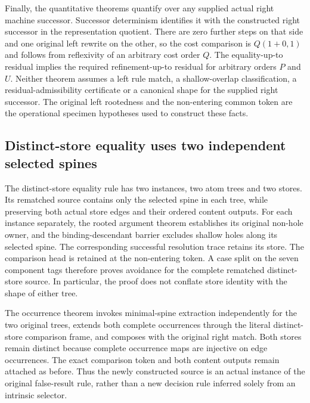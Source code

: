 Finally, the quantitative theorems quantify over any supplied actual right
machine successor. Successor determinism identifies it with the constructed
right successor in the representation quotient. There are zero further steps
on that side and one original left rewrite on the other, so the cost comparison
is $Q(1+0,1)$ and follows from reflexivity of an arbitrary cost order $Q$.
The equality-up-to residual implies the required refinement-up-to residual
for arbitrary orders $P$ and $U$. Neither theorem assumes a left rule match,
a shallow-overlap classification, a residual-admissibility certificate or a
canonical shape for the supplied right successor. The original left rootedness
and the non-entering common token are the operational specimen hypotheses
used to construct these facts.

\subsection{Distinct-store equality uses two independent selected spines}
The distinct-store equality rule has two instances, two atom trees and two
stores. Its rematched source contains only the selected spine in each tree,
while preserving both actual store edges and their ordered content outputs.
For each instance separately, the rooted argument theorem establishes its
original non-hole owner, and the binding-descendant barrier excludes shallow
holes along its selected spine. The corresponding successful resolution trace
retains its store. The comparison head is retained at the non-entering token.
A case split on the seven component tags therefore proves avoidance for the
complete rematched distinct-store source. In particular, the proof does not
conflate store identity with the shape of either tree.

The occurrence theorem invokes minimal-spine extraction independently for
the two original trees, extends both complete occurrences through the literal
distinct-store comparison frame, and composes with the original right match.
Both stores remain distinct because complete occurrence maps are injective
on edge occurrences. The exact comparison token and both content outputs
remain attached as before. Thus the newly constructed source is an actual
instance of the original false-result rule, rather than a new decision rule
inferred solely from an intrinsic selector.

